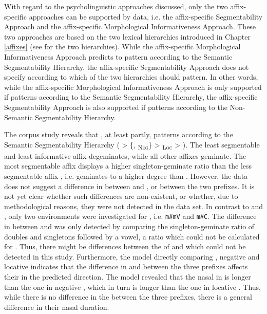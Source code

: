 With regard to the psycholinguistic approaches discussed, only the two affix-specific approaches can be supported by data, i.e. the affix-specific Segmentability Approach and the affix-specific Morphological Informativeness Approach. 
These two approaches are based on the two lexical  hierarchies introduced in Chapter \ref{affixes} (see  for the two hierarchies). While the affix-specific Morphological Informativeness Approach predicts  to pattern according to the Semantic Segmentability Hierarchy, the affix-specific Segmentability Approach does not specify according to which of the two  hierarchies  should pattern. In other words, while the affix-specific Morphological Informativeness Approach is only supported if  patterns according to the Semantic Segmentability Hierarchy, the affix-specific Segmentability Approach is also supported if  patterns according to the Non-Semantic Segmentability Hierarchy. 


The corpus study reveals that , at least partly, patterns according to the Semantic Segmentability Hierarchy ( > \{, \textsubscript{\textsc{Neg}}\} >  \textsubscript{\textsc{Loc}} > ). 
The least segmentable and least informative affix  degeminates, while all other affixes geminate. The most segmentable affix  displays a higher singleton-geminate ratio than the less segmentable affix , i.e.  geminates to a higher degree than . However, the data does not suggest a difference in  between  and , or between the two prefixes.
 It is not yet clear whether such differences are non-existent, or whether, due to methodological reasons, they were not detected in the data set. 
  In contrast to  and , only two environments were investigated for , i.e. \texttt{m\#mV} and \texttt{m\#C}. The difference in  between  and  was only detected by comparing the singleton-geminate ratio of doubles and singletons followed by a vowel, a ratio which could not be calculated for . Thus, there might be differences between the  of  and  which could not be detected in this study.
Furthermore, the model directly comparing , negative  and locative  indicates that the difference in  and  between the three prefixes affects their  in the predicted direction. The model revealed that the nasal in  is longer than the one in negative , which in turn is longer than the one in locative . Thus, while there is no difference in the  between the three prefixes, there is a general difference in  their nasal duration.
 
